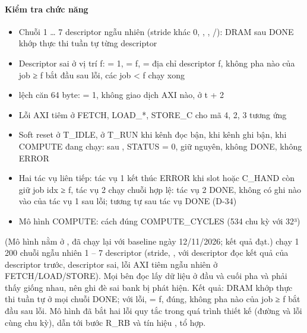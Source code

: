 \documentclass[10pt,a4paper]{article}
\begin{document}
\paragraph{Kiểm tra chức năng}\label{par:10-5}
\begin{itemize}
\item Chuỗi 1 … 7 descriptor ngẫu nhiên (stride khác 0, , , /): DRAM sau DONE khớp thực thi tuần tự từng descriptor
\item Descriptor sai ở vị trí f:  = 1,  = f,  = địa chỉ descriptor f, không pha nào của job ≥ f bắt đầu sau lỗi, các job < f chạy xong
\item {} lệch căn 64 byte:  = 1, không giao dịch AXI nào,  ở t + 2
\item Lỗi AXI tiêm ở FETCH, LOAD\_*, STORE\_C cho mã 4, 2, 3 tương ứng
\item Soft reset ở T\_IDLE, ở T\_RUN khi kênh đọc bận, khi kênh ghi bận, khi COMPUTE đang chạy: sau , STATUS = 0,  giữ nguyên, không DONE, không ERROR
\item Hai tác vụ liên tiếp: tác vụ 1 kết thúc ERROR khi slot hoặc C\_HAND còn giữ job idx ≥ f, tác vụ 2 chạy chuỗi hợp lệ: tác vụ 2 DONE, không có ghi nào vào  của tác vụ 1 sau lỗi; tương tự sau tác vụ DONE (D-34)
\item Mô hình COMPUTE:  cách  đúng COMPUTE\_CYCLES (534 chu kỳ với 32³)
\end{itemize}

\begin{notebox}
(Mô hình nằm ở , đã chạy lại với baseline ngày 12/11/2026; kết quả đạt.)  chạy 1 200 chuỗi ngẫu nhiên 1 – 7 descriptor (stride, ,  với descriptor đọc kết quả của descriptor trước, descriptor sai, lỗi AXI tiêm ngẫu nhiên ở FETCH/LOAD/STORE). Mọi bên đọc lấy dữ liệu ở đầu và cuối pha và phải thấy giống nhau, nên ghi đè sai bank bị phát hiện. Kết quả: DRAM khớp thực thi tuần tự ở mọi chuỗi DONE; với lỗi,  = f,  đúng, không pha nào của job ≥ f bắt đầu sau lỗi. Mô hình đã bắt hai lỗi quy tắc trong quá trình thiết kế (đường  và lỗi cùng chu kỳ), dẫn tới bước R\_RB và tín hiệu ,  tổ hợp.
\end{notebox}
\end{document}
